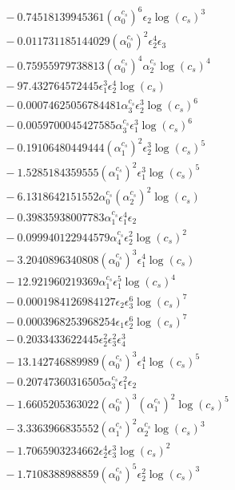 \documentclass[10pt]{article}
\begin{document}
\begin{align*}
&{}  - 0.74518139945361 \left(\alpha_{0}^{c_s}\right)^{6} \epsilon_{2} \log{\left(c_{s} \right)}^{3} \\
&{}  - 0.011731185144029 \left(\alpha_{0}^{c_s}\right)^{2} \epsilon_{2}^{4} \epsilon_{3} \\
&{}  - 0.75955979738813 \left(\alpha_{0}^{c_s}\right)^{4} \alpha_{2}^{c_s} \log{\left(c_{s} \right)}^{4} \\
&{}  - 97.432764572445 \epsilon_{1}^{3} \epsilon_{2}^{4} \log{\left(c_{s} \right)} \\
&{}  - 0.00074625056784481 \alpha_{3}^{c_s} \epsilon_{2}^{3} \log{\left(c_{s} \right)}^{6} \\
&{}  - 0.0059700045427585 \alpha_{3}^{c_s} \epsilon_{1}^{3} \log{\left(c_{s} \right)}^{6} \\
&{}  - 0.19106480449444 \left(\alpha_{1}^{c_s}\right)^{2} \epsilon_{2}^{3} \log{\left(c_{s} \right)}^{5} \\
&{}  - 1.5285184359555 \left(\alpha_{1}^{c_s}\right)^{2} \epsilon_{1}^{3} \log{\left(c_{s} \right)}^{5} \\
&{}  - 6.1318642151552 \alpha_{0}^{c_s} \left(\alpha_{2}^{c_s}\right)^{2} \log{\left(c_{s} \right)} \\
&{}  - 0.39835938007783 \alpha_{1}^{c_s} \epsilon_{1}^{4} \epsilon_{2} \\
&{}  - 0.099940122944579 \alpha_{4}^{c_s} \epsilon_{2}^{2} \log{\left(c_{s} \right)}^{2} \\
&{}  - 3.2040896340808 \left(\alpha_{0}^{c_s}\right)^{3} \epsilon_{1}^{4} \log{\left(c_{s} \right)} \\
&{}  - 12.921960219369 \alpha_{1}^{c_s} \epsilon_{1}^{5} \log{\left(c_{s} \right)}^{4} \\
&{}  - 0.0001984126984127 \epsilon_{2} \epsilon_{3}^{6} \log{\left(c_{s} \right)}^{7} \\
&{}  - 0.0003968253968254 \epsilon_{1} \epsilon_{2}^{6} \log{\left(c_{s} \right)}^{7} \\
&{}  - 0.2033433622445 \epsilon_{2}^{2} \epsilon_{3}^{2} \epsilon_{4}^{3} \\
&{}  - 13.142746889989 \left(\alpha_{0}^{c_s}\right)^{3} \epsilon_{1}^{4} \log{\left(c_{s} \right)}^{5} \\
&{}  - 0.20747360316505 \alpha_{3}^{c_s} \epsilon_{1}^{2} \epsilon_{2} \\
&{}  - 1.6605205363022 \left(\alpha_{0}^{c_s}\right)^{3} \left(\alpha_{1}^{c_s}\right)^{2} \log{\left(c_{s} \right)}^{5} \\
&{}  - 3.3363966835552 \left(\alpha_{1}^{c_s}\right)^{2} \alpha_{2}^{c_s} \log{\left(c_{s} \right)}^{3} \\
&{}  - 1.7065903234662 \epsilon_{2}^{4} \epsilon_{3}^{3} \log{\left(c_{s} \right)}^{2} \\
&{}  - 1.7108388988859 \left(\alpha_{0}^{c_s}\right)^{5} \epsilon_{2}^{2} \log{\left(c_{s} \right)}^{3}
\end{align*}
\end{document}
